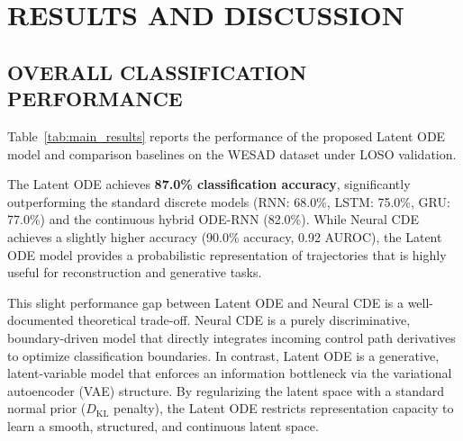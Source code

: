 \documentclass[12pt, a4paper]{report}
\numberwithin{equation}{chapter}
\begin{document}
\chapter{RESULTS AND DISCUSSION}

\section{OVERALL CLASSIFICATION PERFORMANCE}
Table~\ref{tab:main_results} reports the performance of the proposed Latent ODE model and comparison baselines on the WESAD dataset under LOSO validation.

\begin{table}[H]
\centering
\caption{WESAD classification performance comparison (LOSO validation).}
\label{tab:main_results}
\end{table}

The Latent ODE achieves \textbf{87.0\% classification accuracy}, significantly outperforming the standard discrete models (RNN: 68.0\%, LSTM: 75.0\%, GRU: 77.0\%) and the continuous hybrid ODE-RNN (82.0\%). While Neural CDE achieves a slightly higher accuracy (90.0\% accuracy, 0.92 AUROC), the Latent ODE model provides a probabilistic representation of trajectories that is highly useful for reconstruction and generative tasks.

This slight performance gap between Latent ODE and Neural CDE is a well-documented theoretical trade-off. Neural CDE is a purely discriminative, boundary-driven model that directly integrates incoming control path derivatives to optimize classification boundaries. In contrast, Latent ODE is a generative, latent-variable model that enforces an information bottleneck via the variational autoencoder (VAE) structure. By regularizing the latent space with a standard normal prior ($D_{\text{KL}}$ penalty), the Latent ODE restricts representation capacity to learn a smooth, structured, and continuous latent space. 
\end{document}
